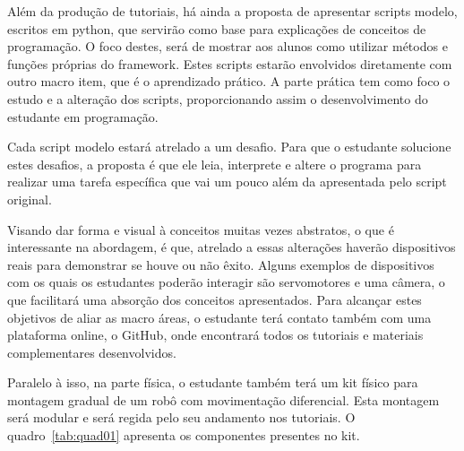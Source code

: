 Além da produção de tutoriais, há ainda a proposta de apresentar scripts modelo, escritos em python, que servirão como base para explicações de conceitos
de programação. O foco destes, será de mostrar aos alunos como utilizar métodos e funções próprias do framework. Estes scripts estarão envolvidos diretamente com outro macro item, que é o aprendizado prático. A parte prática tem como foco o estudo e a alteração dos scripts, proporcionando assim o desenvolvimento do estudante em programação.

Cada script modelo estará atrelado a um desafio. Para que o estudante solucione estes desafios, a proposta é que ele leia, interprete e altere o programa
para realizar uma tarefa específica que vai um pouco além da apresentada pelo script original.

Visando dar forma e visual à conceitos muitas vezes abstratos, o que é interessante na abordagem, é que, atrelado a essas alterações haverão dispositivos
reais para demonstrar se houve ou não êxito. Alguns exemplos de dispositivos com os quais os estudantes poderão interagir são servomotores e uma câmera, o que
facilitará uma absorção dos conceitos apresentados.
Para alcançar estes objetivos de aliar as macro áreas, o estudante terá contato também com uma plataforma online, o GitHub, onde encontrará todos os tutoriais e materiais complementares desenvolvidos.

Paralelo à isso, na parte física, o estudante também terá um kit físico para montagem gradual de um robô com movimentação diferencial. Esta montagem será modular e será regida pelo seu andamento nos tutoriais. O quadro~\ref{tab:quad01} apresenta os componentes presentes no kit.

